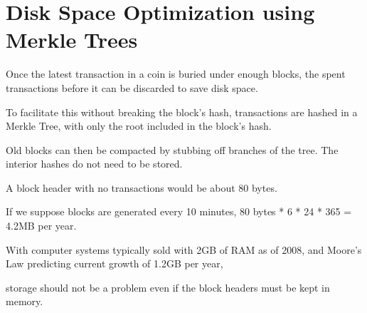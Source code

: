 \documentclass{article}
\begin{document}
\section{Disk Space Optimization using Merkle Trees}

Once the latest transaction in a coin is buried under enough blocks, the spent transactions before it can be discarded to save disk space.

To facilitate this without breaking the block's hash, transactions are hashed in a Merkle Tree, with only the root included in the block's hash.

Old blocks can then be compacted by stubbing off branches of the tree. The interior hashes do not need to be stored.

A block header with no transactions would be about 80 bytes.

If we suppose blocks are generated every 10 minutes, 80 bytes * 6 * 24 * 365 = 4.2MB per year.

With computer systems typically sold with 2GB of RAM as of 2008, and Moore's Law predicting current growth of 1.2GB per year,

storage should not be a problem even if the block headers must be kept in memory.
\end{document}

